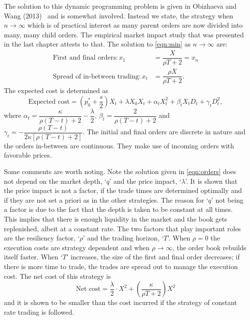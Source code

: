 The solution to this dynamic programming problem is given in Obizhaeva and Wang (2013)~\cite[p.14, Proposition 1]{obizhaeva} and is somewhat involved. Instead we state, the strategy when $n \to \infty$ which is of practical interest as many parent orders are now divided into many, many child orders. The empirical market impact study that was presented in the last chapter attests to that. The solution to \eqref{eqn:min} as $n \to \infty$ are:
	\begin{equation} \label{eqn:orders}
	\begin{aligned}
	\text{First and final orders}: x_1&= \dfrac{X}{\rho T+2} = x_n  \\
	\text{Spread of in-between trading}: x_t&= \dfrac{\rho X}{\rho T+2}.
	\end{aligned}
	\end{equation}
The expected cost is determined as
	\begin{equation} \label{eqn:expected}
	\text{Expected cost}= \left( p_0^* + \dfrac{s}{2} \right) X_t + \lambda X_0 X_t + \alpha_t X_t^2 + \beta_t X_t D_t + \gamma_t D_t^2,
	\end{equation}
where $\alpha_t= \dfrac{\kappa}{\rho(T-t)+2} - \dfrac{\lambda}{2}$, $\beta_t= \dfrac{2}{\rho(T-t) + 2}$ and $\gamma_t= - \dfrac{\rho(T-t)}{2 \kappa[\rho(T-t) + 2]}$. The initial and final orders are discrete in nature and the orders in-between are continuous. They make use of incoming orders with favorable prices. 


Some comments are worth noting. Note the solution given in \eqref{eqn:orders} does not depend on the market depth, `$q$' and the price impact, `$\lambda$'. It is shown that the price impact is not a factor, if the trade times are determined optimally and if they are not set a priori as in the other strategies. The reason for `$q$' not being a factor is due to the fact that the depth is taken to be constant at all times. This implies that there is enough liquidity in the market and the book gets replenished, albeit at a constant rate. The two factors that play important roles are the resiliency factor, `$\rho$' and the trading horizon, `$T$'. When $\rho=0$ the execution costs are strategy dependent and when $\rho \to \infty$, the order book rebuilds itself faster. When `$T$' increases, the size of the first and final order decreases; if there is more time to trade, the trades are spread out to manage the execution cost. The net cost of this strategy is
	\begin{equation}\label{eqn:netcost}
	\text{Net cost}=\dfrac{\lambda}{2} \cdot X^2 + \left(\dfrac{\kappa}{\rho T+2} \right) X^2
	\end{equation}
and it is shown to be smaller than the cost incurred if the strategy of constant rate trading is followed. 


